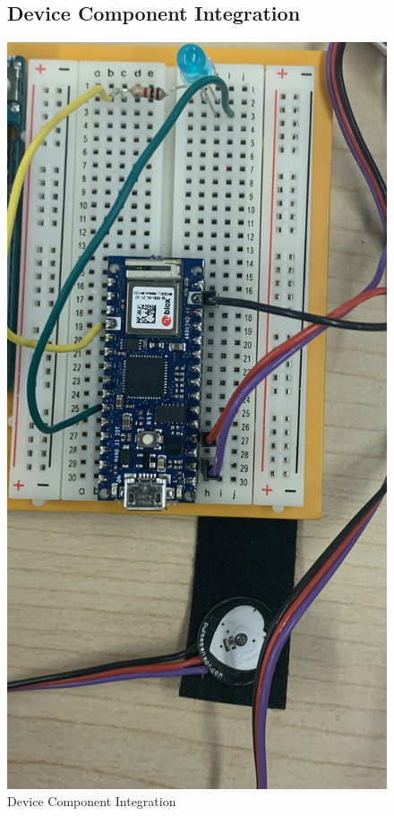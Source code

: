 \documentclass{report}
\begin{document}
\begin{figure}
\subsection{Device Component Integration}
    \centering
    \includegraphics[scale=0.10]{images/device.JPG}
    \caption{Device Component Integration}
    \label{fig:image8}
\end{figure}
\end{document}
